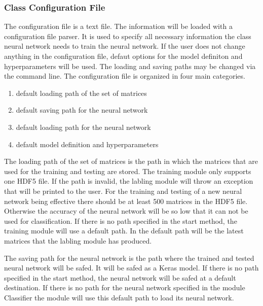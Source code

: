 \documentclass[parskip=full]{scrartcl}
\begin{document}
\subsubsection{Class Configuration File}
The configuration file is a text file. The information will be loaded with a configuration file parser.
It is used to specify all necessary information the class \gls{neural network} needs to train the neural network.
If the user does not change anything in the configuration file, defaut options for the model definiton and hyperparameters will be used.
The loading and saving paths may be changed via the command line. The configuration file is organized in four main categories.
\begin{enumerate}
\item default loading path of the set of matrices 
\item default saving path for the \gls{neural network}
\item default loading path for the \gls{neural network}
\item default model definition and hyperparameters
\end{enumerate}
The loading path of the set of matrices is the path in which the matrices that are used for the training and testing are stored.
The training module only supports one \gls{HDF5} file.
If the path is invalid, the labling module will throw an exception that will be printed to the user.
For the training and testing of a new neural network being effective there should be at least 500 matrices in the \gls{HDF5} file.
Otherwise the accuracy of the \gls{neural network} will be so low that it can not be used for classification.
If there is no path specified in the start method, the training module will use a default path.
In the default path will be the latest matrices that the labling module has produced. \newline

The saving path for the \gls{neural network} is the path where the trained and tested \gls{neural network} will be safed.
It will be safed as a Keras model.
If there is no path specified in the start method, the \gls{neural network} will be safed at a default destination.
If there is no path for the \gls{neural network} specified in the module Classifier the module will use this default path to load its \gls{neural network}.\newline
\end{document}
